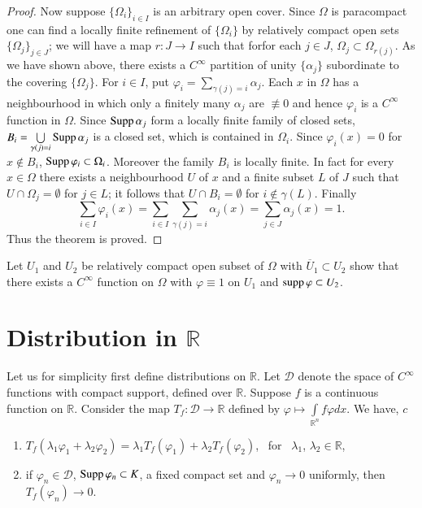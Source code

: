 \begin{proof}
Now suppose $\{\Omega_{i}\}_{i\in I}$ is an arbitrary open cover. Since $\Omega$ is paracompact one can find a locally finite refinement of $\{\Omega_{i}\}$ by relatively compact open sets $\{\Omega_{j}\}_{j\in J}$; we will have a map $r:J\to I$ such that for\pageoriginale for each $j\in J$, $\Omega_{j}\subset \Omega_{r(j)}$. As we have shown above, there exists a $C^{\infty}$ partition of unity $\{\alpha_{j}\}$ subordinate to the covering $\{\Omega_{j}\}$. For $i\in I$, put $\varphi_{i}=\sum\limits_{\gamma (j)=i}\alpha_{j}$. Each $x$ in $\Omega$ has a neighbourhood in which only a finitely many $\alpha_{j}$ are $\nequiv 0$ and hence $\varphi_{i}$ is a $C^{\infty}$ function in $\Omega$. Since $\operatorname{Supp} \alpha_{j}$ form a locally finite family of closed sets, $B_{i}=\bigcup\limits_{\gamma(j)=i} \operatorname{Supp} \alpha_{j}$ is a closed set, which is contained in $\Omega_{i}$. Since $\varphi_{i}(x)=0$ for $x\not\in B_{i}$, $\operatorname{Supp} \varphi_{i}\subset \Omega_{i}$. Moreover the family $B_{i}$ is locally finite. In fact for every $x\in \Omega$ there exists a neighbourhood $U$ of $x$ and a finite subset $L$ of $J$ such that $U\cap \Omega_{j}=\emptyset$ for $j\in L$; it follows that $U\cap B_{i}=\emptyset$ for $i\not\in \gamma(L)$. Finally 
$$
\sum\limits_{i\in I}\varphi_{i}(x)=\sum\limits_{i\in I}\sum\limits_{\gamma(j)=i}\alpha_{j}(x)=\sum\limits_{j\in J}\alpha_{j}(x)=1.
$$
Thus the theorem is proved.
\end{proof}

\begin{exer*}
Let $U_{1}$ and $U_{2}$ be relatively compact open subset of $\Omega$ with $\overline{U}_{1}\subset U_{2}$ show that there exists a $C^{\infty}$ function on $\Omega$ with $\varphi\equiv 1$ on $U_{1}$ and $\operatorname{supp} \varphi\subset U_{2}$.
\end{exer*}

\section*{Distribution in $\mathbb{R}$}

Let us for simplicity first define distributions on $\mathbb{R}$. Let $\mathcal{D}$ denote the space of $C^{\infty}$ functions with compact support, defined over $\mathbb{R}$. Suppose $f$ is a continuous function on $\mathbb{R}$. Consider the map $T_{f}:\mathcal{D}\to \mathbb{R}$ defined by $\varphi \mapsto \int\limits_{\mathbb{R}^{n}}f\varphi dx$. We have, $c$
\begin{enumerate}
\renewcommand{\labelenumi}{(\theenumi)}
\item $T_{f}(\lambda_{1}\varphi_{1}+\lambda_{2}\varphi_{2})=\lambda_{1}T_{f}(\varphi_{1})+\lambda_{2}T_{f}(\varphi_{2})$, \ for \ $\lambda_{1}$, $\lambda_{2}\in \mathbb{R}$,

\item if $\varphi_{n}\in \mathcal{D}$, $\operatorname{Supp} \varphi_{n}\subset K$, a fixed compact set and $\varphi_{n}\to 0$ uniformly, then $T_{f}(\varphi_{n})\to 0$.
\end{enumerate}

